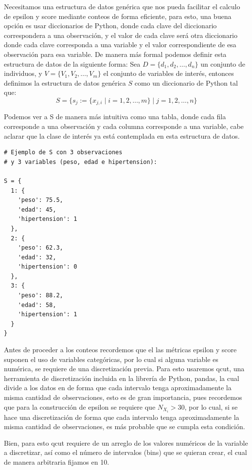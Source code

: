 \documentclass[
 12pt,
 letterpaper,
]{article}
\theoremstyle{teoremaBreak}
\theoremstyle{plain}
\theoremstyle{definition}
\begin{document}
Necesitamos una estructura de datos genérica que nos pueda facilitar el calculo de epsilon y score mediante 
conteos de forma eficiente, para esto, una buena opción es usar diccionarios de Python, donde cada clave del 
diccionario correspondera a una observación, y el valor de cada clave será otra diccionario donde cada clave 
corresponda a una variable y el valor correspondiente de esa observación para esa variable. De manera más formal 
podemos definir esta estructura de datos de la siguiente forma:
Sea $D = \{d_1, d_2, \ldots, d_n\}$ un conjunto de individuos, y $V = \{V_1, V_2, \ldots, V_m\}$ el conjunto de variables de interés, entonces definimos la estructura de datos genérica $S$ como un diccionario de Python tal que:
$$S = \{s_{j}:= \{x_{j,i} \mid i = 1, 2, \ldots, m\} \mid j = 1, 2, \ldots, n\}$$

Podemos ver a S de manera más intuitiva como una tabla, donde cada fila corresponde a una observación y cada 
columna corresponde a una variable, cabe aclarar que la clase de interés ya está contemplada en esta estructura 
de datos. 

\begin{lstlisting}[style=pseudocodigo]
# Ejemplo de S con 3 observaciones
# y 3 variables (peso, edad e hipertension):

S = {
  1: {
    'peso': 75.5,
    'edad': 45,
    'hipertension': 1
  },
  2: {
    'peso': 62.3,
    'edad': 32,
    'hipertension': 0
  },
  3: {
    'peso': 88.2,
    'edad': 58,
    'hipertension': 1
  }
}
\end{lstlisting}

Antes de proceder a los conteos recordemos que el las métricas epsilon y score suponen el uso de variables 
categóricas, por lo cual si alguna variable es numérica, se requiere de una discretización previa. 
Para esto usaremos qcut, una herramienta de discretización incluida en la librería de Python, pandas, 
la cual divide a los datos en de forma que cada intervalo tenga aproximadamente la misma cantidad de observaciones, 
esto es de gran importancia, pues recordemos que para la construcción de epsilon se requiere que $N_{X_i} > 30$, 
por lo cual, si se hace una discretización de forma que cada intervalo tenga aproximadamente la misma cantidad 
de observaciones, es más probable que se cumpla esta condición.

Bien, para esto qcut requiere de un arreglo de los valores numéricos de la variable a discretizar, 
así como el número de intervalos (bins) que se quieran crear, el cual de manera arbitraria fijamos en 10. 
\end{document}
